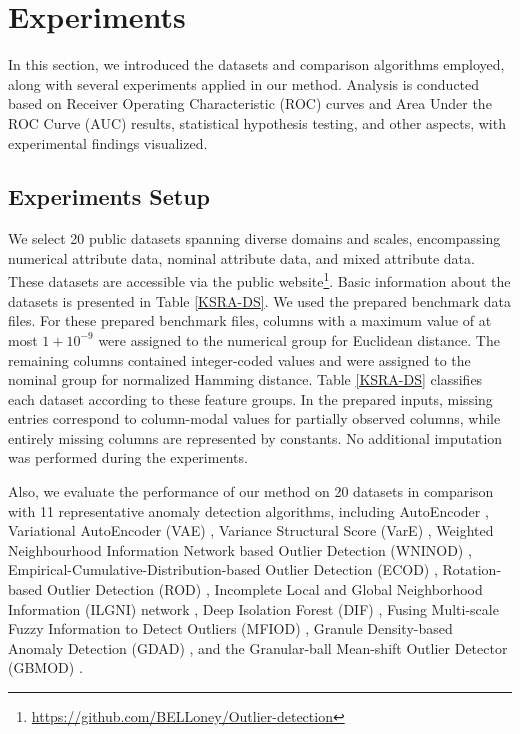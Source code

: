 \documentclass[ASNA,twocolumn]{USG} %
\begin{document}
\section{Experiments}\label{Experiments}

In this section, we introduced the datasets and comparison algorithms employed, along with several experiments applied in our method. Analysis is conducted based on Receiver Operating
Characteristic (ROC) curves and Area Under the ROC
Curve (AUC) results, statistical hypothesis testing, and other aspects, with experimental findings visualized.

\subsection{Experiments Setup}

We select 20 public datasets spanning diverse domains and scales, encompassing numerical attribute data, nominal attribute data, and mixed attribute data. These datasets are accessible via the public website\footnote{\url{https://github.com/BELLoney/Outlier-detection}}. Basic information about the datasets is presented in Table \ref{KSRA-DS}. We used the prepared benchmark data files. For these prepared benchmark files, columns with a maximum value of at most $1 + 10^{-9}$ were assigned to the numerical group for Euclidean distance. The remaining columns contained integer-coded values and were assigned to the nominal group for normalized Hamming distance. Table \ref{KSRA-DS} classifies each dataset according to these feature groups. In the prepared inputs, missing entries correspond to column-modal values for partially observed columns, while entirely missing columns are represented by constants. No additional imputation was performed during the experiments.

Also, we evaluate the performance of our method on 20 datasets in comparison with 11 representative anomaly detection algorithms, including AutoEncoder \cite{hinton2006reducing}, Variational AutoEncoder (VAE) \cite{kingma2013auto}, Variance Structural Score (VarE) \cite{8526528}, Weighted Neighbourhood Information Network based Outlier Detection (WNINOD) \cite{wang2021outlier}, Empirical-Cumulative-Distribution-based Outlier Detection (ECOD) \cite{li2022ecod}, Rotation-based Outlier Detection (ROD) \cite{almardeny2020novel}, Incomplete Local and Global Neighborhood Information (ILGNI) network \cite{li2023incomplete}, Deep Isolation Forest (DIF) \cite{xu2023deep}, Fusing Multi-scale Fuzzy Information to Detect Outliers (MFIOD) \cite{chen2024fusing}, Granule Density-based Anomaly Detection (GDAD) \cite{chen2025integrating}, and the Granular-ball Mean-shift Outlier Detector (GBMOD) \cite{cheng2025gbmod}. 
\end{document}
